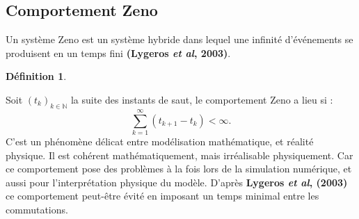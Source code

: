 \documentclass[12pt, oneside]{report} %
\newcommand{\N}{\mathbb{N}} %
\theoremstyle{definition}
\newtheorem{defn}{\textbf{Définition}}[section]
\newtheorem{exam}{\textbf{Exemple}}[section]
\theoremstyle{remark}
\begin{document}
	
	\subsection{Comportement Zeno}
	
	Un système Zeno est un système hybride dans lequel une infinité d'événements se produisent en un temps fini \textbf{(Lygeros \textit{et al}, 2003)}.
	\begin{defn}\
		
		Soit $(t_k)_{k\in\N}$ la suite des instants de saut, le comportement Zeno a lieu si :\begin{equation}
			\sum_{k=1}^{\infty}(t_{k+1}-t_{k}) < \infty.
		\end{equation}
		C'est un phénomène délicat entre modélisation mathématique, et réalité physique. Il est cohérent mathématiquement, mais irréalisable physiquement. Car ce comportement pose des problèmes à la fois lors de la simulation numérique, et aussi pour l'interprétation physique du modèle. D'après \textbf{Lygeros \textit{et al}, (2003)} ce comportement peut-être évité en imposant un temps minimal entre les commutations.
	\end{defn}
%	
\end{document}
